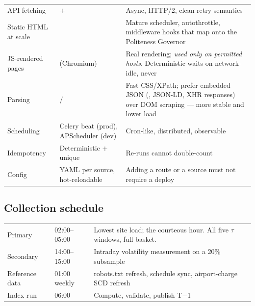 \begin{center}
\footnotesize
\begin{tabularx}{\textwidth}{@{}L{3.2cm} L{3.2cm} X@{}}
\toprule
{} &  &  \\
\midrule
API fetching &  $+$  & Async, HTTP/2, clean retry semantics \\
Static HTML at scale &  & Mature scheduler, autothrottle, middleware hooks that map onto the Politeness Governor \\
JS-rendered pages &  (Chromium) & Real rendering; \emph{used only on permitted hosts}. Deterministic waits on network-idle, never  \\
Parsing &  /  & Fast CSS/XPath; prefer embedded JSON (, JSON-LD, XHR responses) over DOM scraping --- more stable and lower load \\
Scheduling & Celery beat (prod), APScheduler (dev) & Cron-like, distributed, observable \\
Idempotency & Deterministic  $+$ unique  & Re-runs cannot double-count \\
Config & YAML per source, hot-reloadable & Adding a route or a source must not require a deploy \\
\bottomrule
\end{tabularx}
\end{center}

\subsection{Collection schedule}

\begin{center}
\footnotesize
\begin{tabularx}{\textwidth}{@{}L{2.6cm} L{3.0cm} X@{}}
\toprule
{} &  &  \\
\midrule
Primary & 02:00--05:00 & Lowest site load; the courteous hour. All five $\tau$ windows, full basket. \\
Secondary & 14:00--15:00 & Intraday volatility measurement on a 20\% subsample \\
Reference data & 01:00 weekly & robots.txt refresh, schedule sync, airport-charge SCD refresh \\
Index run & 06:00 & Compute, validate, publish T$-$1 \\
\bottomrule
\end{tabularx}
\end{center}

